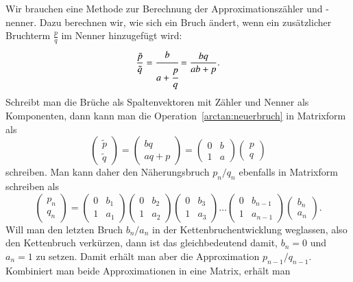 \begin{refsection}
Wir brauchen eine Methode zur Berechnung der Approximationszähler und -nenner.
Dazu berechnen wir, wie sich ein Bruch ändert, wenn ein zusätzlicher
Bruchterm $\frac{p}{q}$ im Nenner hinzugefügt wird:
\begin{equation}
\frac{\tilde{p}}{\tilde{q}}
=
\cfrac{b}{a+\cfrac{p}{q}}
=
\frac{bq}{ab+p}.
\label{arctan:neuerbruch}
\end{equation}
Schreibt man die Brüche als Spaltenvektoren mit Zähler und Nenner als
Komponenten, dann kann man die Operation~\eqref{arctan:neuerbruch}
in Matrixform als
\[
\begin{pmatrix}
\tilde{p}\\\tilde{q}
\end{pmatrix}
=
\begin{pmatrix}
bq\\
aq+p
\end{pmatrix}
=
\begin{pmatrix}
0&b\\
1&a
\end{pmatrix}
\begin{pmatrix}
p\\
q
\end{pmatrix}
\]
schreiben.
Man kann daher den Näherungsbruch $p_n/q_n$ ebenfalls in Matrixform
schreiben als
\[
\begin{pmatrix}
p_n\\q_n
\end{pmatrix}
=
\begin{pmatrix} 0&b_1\\1&a_1\end{pmatrix}
\begin{pmatrix} 0&b_2\\1&a_2\end{pmatrix}
\begin{pmatrix} 0&b_3\\1&a_3\end{pmatrix}
\dots
\begin{pmatrix} 0&b_{n-1}\\1&a_{n-1}\end{pmatrix}
\begin{pmatrix} b_n\\a_n\end{pmatrix}.
\]
Will man den letzten Bruch $b_n/a_n$ in der Kettenbruchentwicklung
weglassen, also den Kettenbruch verkürzen, dann ist das gleichbedeutend
damit, $b_n=0$ und $a_n=1$ zu setzen.
Damit erhält man aber die Approximation $p_{n-1}/q_{n-1}$.
Kombiniert man beide Approximationen in eine Matrix, erhält man

\end{refsection}
